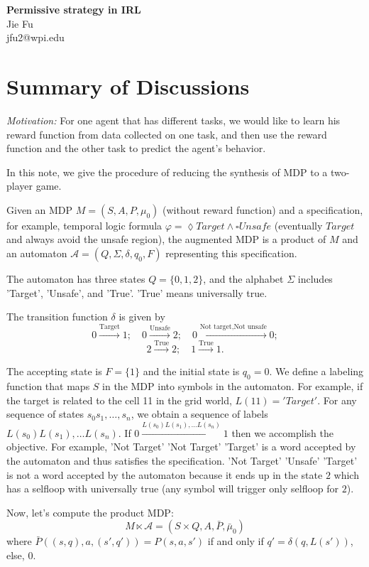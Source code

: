 \documentclass{article}[11pt]
\begin{document}
\begin{center}
\textbf{ \Large Permissive strategy in IRL}\\
Jie Fu\\
 jfu2@wpi.edu
\end{center}

\section{Summary of Discussions}
\emph{Motivation: } For one agent that has different tasks, we would
like to learn his reward function from data collected on one task, and
then use the reward function and the other task to predict the agent's
behavior.


In this note, we give the procedure of reducing the synthesis of MDP
to a two-player game.

Given an MDP $M= (S,A,P, \mu_0)$ (without reward function) and a
specification, for example, temporal logic formula
$\varphi = \lozenge Target \land \square Unsafe$ (eventually $Target$
and always avoid the unsafe region), the augmented MDP is a product of
$M$ and an automaton $\mathcal{A} = (Q, \Sigma, \delta, q_0, F)$
representing this specification.

The automaton has three states $Q= \{0,1,2\}$, and  the alphabet
$\Sigma$ includes 'Target', 'Unsafe', and 'True'. 'True' means
universally true.

The transition function $\delta$ is given by
\[
0 \xrightarrow{\mbox{Target}}1;\quad 0 \xrightarrow{\mbox{Unsafe}} 2;\quad 0 \xrightarrow{\mbox{Not target}, \mbox{Not unsafe}} 0; 
\]
\[
2 \xrightarrow{\mbox{True}} 2;\quad 1 \xrightarrow{\mbox{True}}1.
\]

The accepting state is $F =\{1\}$ and the initial state is $q_0 =0$. We define a
labeling function that maps $S$ in the MDP into symbols in the
automaton. For example, if the target is related to the cell 11 in the
grid world, $L(11)= 'Target'$. For any sequence of states
$s_0s_1,\ldots, s_n$, we obtain a sequence of labels
$L(s_0)L(s_1),\ldots L(s_n)$. If
$0 \xrightarrow{L(s_0)L(s_1),\ldots L(s_n) }1$ then we accomplish the
objective. For example, 'Not Target' 'Not Target' 'Target' is a word
accepted by the automaton and thus satisfies the specification. 'Not
Target' 'Unsafe' 'Target' is not a word accepted by the automaton
because it ends up in the state $2$ which has a selfloop with
universally true (any symbol will trigger only selfloop for $2$).

Now, let's compute the product MDP:
\[
M\ltimes \mathcal{A } = (S\times Q, A, \bar P, \bar \mu_0)
\]
where $\bar P((s,q), a,(s',q')) = P(s,a,s')$ if and only if
$q' = \delta(q, L(s'))$, else, $0$.
\end{document}
